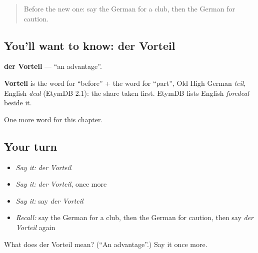 \begin{quote}
Before the new one: say the German for a club, then the German for caution.
\end{quote}

\subsection*{You'll want to know: der Vorteil}
\textbf{der Vorteil} — \textquotedblleft{}an advantage\textquotedblright{}.

\begin{cousinweb}
\textbf{Vorteil} is the word for \textquotedblleft{}before\textquotedblright{} + the word for \textquotedblleft{}part\textquotedblright{}, Old High German \emph{teil}, English \emph{deal} (EtymDB 2.1): the share taken first. EtymDB lists English \emph{foredeal} beside it.
\end{cousinweb}

\begin{grammarlens}[title={What you've built}]
One more word for this chapter.
\end{grammarlens}

\subsection*{Your turn}
\begin{itemize}
\raggedright
  \item \emph{Say it:} \emph{der Vorteil}
  \item \emph{Say it:} \emph{der Vorteil}, once more
  \item \emph{Say it:} say \emph{der Vorteil}
  \item \emph{Recall:} say the German for a club, then the German for caution, then say \emph{der Vorteil} again
\end{itemize}

\begin{tcolorbox}[breakable,colback=teal!4,colframe=teal!35!black,title={Before you move on}]
What does der Vorteil mean? (\textquotedblleft{}An advantage\textquotedblright{}.) Say it once more.
\end{tcolorbox}
